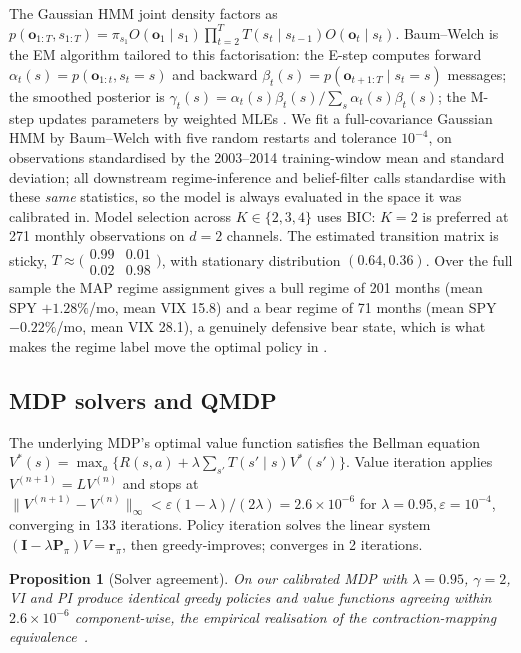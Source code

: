 \documentclass[11pt]{article}
\theoremstyle{plain1}
\newtheorem{proposition}[theorem]{Proposition}
\theoremstyle{definition1}
\newcommand{\1}{\mathbf{1}}
\begin{document}
The Gaussian HMM joint density factors as $p(\mathbf{o}_{1:T},s_{1:T})=\pi_{s_1}O(\mathbf{o}_1\mid s_1)\prod_{t=2}^T T(s_t\mid s_{t-1})O(\mathbf{o}_t\mid s_t)$. Baum--Welch is the EM algorithm tailored to this factorisation: the E-step computes forward $\alpha_t(s)=p(\mathbf{o}_{1:t},s_t{=}s)$ and backward $\beta_t(s)=p(\mathbf{o}_{t+1:T}\mid s_t{=}s)$ messages; the smoothed posterior is $\gamma_t(s)=\alpha_t(s)\beta_t(s)/\sum_s \alpha_t(s)\beta_t(s)$; the M-step updates parameters by weighted MLEs \cite{rabiner1989}. We fit a full-covariance Gaussian HMM by Baum--Welch with five random restarts and tolerance $10^{-4}$, on observations standardised by the 2003--2014 training-window mean and standard deviation; all downstream regime-inference and belief-filter calls standardise with these \emph{same} statistics, so the model is always evaluated in the space it was calibrated in. Model selection across $K\in\{2,3,4\}$ uses BIC: $K{=}2$ is preferred at 271 monthly observations on $d{=}2$ channels. The estimated transition matrix is sticky, $T\approx\bigl(\begin{smallmatrix}0.99 & 0.01\\ 0.02 & 0.98\end{smallmatrix}\bigr)$, with stationary distribution $(0.64,0.36)$. Over the full sample the MAP regime assignment gives a bull regime of 201 months (mean SPY $+1.28\%$/mo, mean VIX 15.8) and a bear regime of 71 months (mean SPY $-0.22\%$/mo, mean VIX 28.1), a genuinely defensive bear state, which is what makes the regime label move the optimal policy in .

\subsection{MDP solvers and QMDP}\label{sec:vi-pi}

The underlying MDP's optimal value function satisfies the Bellman equation $V^\ast(s)=\max_a\{R(s,a)+\lambda\sum_{s'}T(s'\mid s)V^\ast(s')\}$. Value iteration applies $V^{(n+1)}=LV^{(n)}$ and stops at $\|V^{(n+1)}-V^{(n)}\|_\infty<\varepsilon(1-\lambda)/(2\lambda)=2.6\times 10^{-6}$ for $\lambda{=}0.95,\varepsilon{=}10^{-4}$, converging in 133 iterations. Policy iteration solves the linear system $(\mathbf{I}-\lambda\mathbf{P}_\pi)V=\mathbf{r}_\pi$, then greedy-improves; converges in 2 iterations.

\begin{proposition}[Solver agreement]\label{prop:agreement}
On our calibrated MDP with $\lambda{=}0.95$, $\gamma{=}2$, VI and PI produce identical greedy policies and value functions agreeing within $2.6\times 10^{-6}$ component-wise, the empirical realisation of the contraction-mapping equivalence~\cite{puterman}.
\end{proposition}
\end{document}
